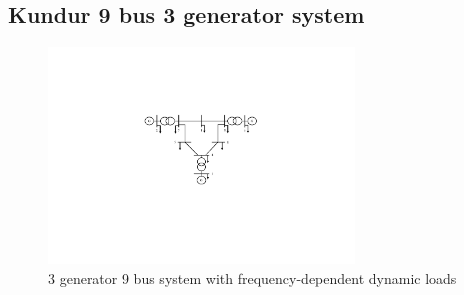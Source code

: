 \documentclass[final]{IEEEtran}
\begin{document}
\subsection{Kundur 9 bus 3 generator system}
\begin{figure}[t!]
\centering
\includegraphics[width = 3.2in]{3generator9bus}
\caption{3 generator 9 bus system with frequency-dependent dynamic loads} \label{fig.3generator9bus}
\end{figure}
\end{document}
